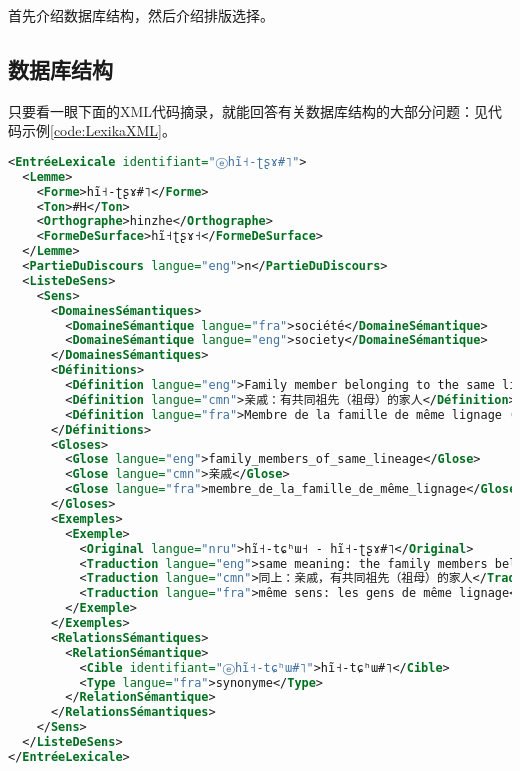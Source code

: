 首先介绍数据库结构，然后介绍排版选择。

\subsection{数据库结构}

只要看一眼下面的XML代码摘录，就能回答有关数据库结构的大部分问题：见代码示例\ref{code:LexikaXML}。

\begin{lstlisting}[language=XML, caption=说明词条结构的XML代码摘录, label=code:LexikaXML]
<EntréeLexicale identifiant="ⓔhĩ˧-ʈʂɤ#˥">
  <Lemme>
    <Forme>hĩ˧-ʈʂɤ#˥</Forme>
    <Ton>#H</Ton>
    <Orthographe>hinzhe</Orthographe>
    <FormeDeSurface>hĩ˧ʈʂɤ˧</FormeDeSurface>
  </Lemme>
  <PartieDuDiscours langue="eng">n</PartieDuDiscours>
  <ListeDeSens>
    <Sens>
      <DomainesSémantiques>
        <DomaineSémantique langue="fra">société</DomaineSémantique>
        <DomaineSémantique langue="eng">society</DomaineSémantique>
      </DomainesSémantiques>
      <Définitions>
        <Définition langue="eng">Family member belonging to the same lineage (on the mother's side).</Définition>
        <Définition langue="cmn">亲戚：有共同祖先（祖母）的家人</Définition>
        <Définition langue="fra">Membre de la famille de même lignage (du côté maternel).</Définition>
      </Définitions>
      <Gloses>
        <Glose langue="eng">family_members_of_same_lineage</Glose>
        <Glose langue="cmn">亲戚</Glose>
        <Glose langue="fra">membre_de_la_famille_de_même_lignage</Glose>
      </Gloses>
      <Exemples>
        <Exemple>
          <Original langue="nru">hĩ˧-tɕʰɯ˧ - hĩ˧-ʈʂɤ#˥</Original>
          <Traduction langue="eng">same meaning: the family members belonging to the same lineage</Traduction>
          <Traduction langue="cmn">同上：亲戚，有共同祖先（祖母）的家人</Traduction>
          <Traduction langue="fra">même sens: les gens de même lignage</Traduction>
        </Exemple>
      </Exemples>
      <RelationsSémantiques>
        <RelationSémantique>
          <Cible identifiant="ⓔhĩ˧-tɕʰɯ#˥">hĩ˧-tɕʰɯ#˥</Cible>
          <Type langue="fra">synonyme</Type>
        </RelationSémantique>
      </RelationsSémantiques>
    </Sens>
  </ListeDeSens>
</EntréeLexicale>
\end{lstlisting}



